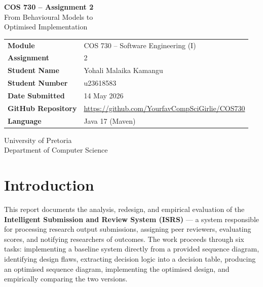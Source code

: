 \documentclass[12pt, a4paper]{article}
\begin{document}
\begin{titlepage}
    \centering
    \vspace*{2cm}

    {\Huge\bfseries COS 730 -- Assignment 2\\[0.4cm]}
    {\LARGE From Behavioural Models to\\Optimised Implementation\\[2cm]}

    \begin{tabular}{ll}
        \toprule
        \textbf{Module}            & COS 730 -- Software Engineering (I) \\
        \textbf{Assignment}        & 2 \\
        \textbf{Student Name}      & Yohali Malaika Kamangu \\
        \textbf{Student Number}    & u23618583 \\
        \textbf{Date Submitted}    & 14 May 2026 \\
        \textbf{GitHub Repository} & \url{https://github.com/YourfavCompSciGirlie/COS730} \\
        \textbf{Language}          & Java 17 (Maven) \\
        \bottomrule
    \end{tabular}

    \vfill
    {\large University of Pretoria\\Department of Computer Science}
\end{titlepage}

\tableofcontents
\newpage

\section{Introduction}
\label{sec:intro}

This report documents the analysis, redesign, and empirical evaluation of the \textbf{Intelligent Submission and Review System (ISRS)} --- a system responsible for processing research output submissions, assigning peer reviewers, evaluating scores, and notifying researchers of outcomes. The work proceeds through six tasks: implementing a baseline system directly from a provided sequence diagram, identifying design flaws, extracting decision logic into a decision table, producing an optimised sequence diagram, implementing the optimised design, and empirically comparing the two versions.
\end{document}
